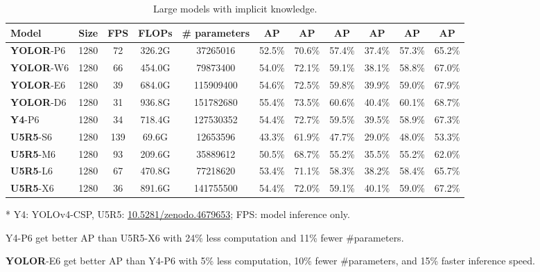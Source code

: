 \documentclass[10pt,twocolumn,letterpaper]{article}
\begin{document}
\begin{table*}[t]
	\centering
	\begin{threeparttable}[t]
		\footnotesize
		\caption{Large models with implicit knowledge.}
		\label{table:large}
		\setlength\tabcolsep{5.8pt}
		\begin{tabular}{lcccccccccc}
			\toprule
			\textbf{Model} & \textbf{Size} & \textbf{FPS} & \textbf{FLOPs} & \textbf{\# parameters} & \textbf{AP} & \textbf{AP} & \textbf{AP} & \textbf{AP} & \textbf{AP} & \textbf{AP} \\				
			\midrule
			\textbf{YOLOR}-P6 & 1280 & 72 & 326.2G & 37265016 & 52.5\% & 70.6\% & 57.4\% & 37.4\% & 57.3\% & 65.2\% \\
			\textbf{YOLOR}-W6 & 1280 & 66 & 454.0G & 79873400 & 54.0\% & 72.1\% & 59.1\% & 38.1\% & 58.8\% & 67.0\% \\
			\textbf{YOLOR}-E6 & 1280 & 39 & 684.0G & 115909400 & 54.6\% & 72.5\% & 59.8\% & 39.9\% & 59.0\% & 67.9\% \\
			\textbf{YOLOR}-D6 & 1280 & 31 & 936.8G & 151782680 & 55.4\% & 73.5\% & 60.6\% & 40.4\% & 60.1\% & 68.7\% \\
			\midrule
			\textbf{Y4}-P6 & 1280 & 34 & 718.4G & 127530352 & 54.4\% & 72.7\% & 59.5\% & 39.5\% & 58.9\% & 67.3\% \\
			\midrule
			\textbf{U5R5}-S6 & 1280 & 139 & 69.6G & 12653596 & 43.3\% & 61.9\% & 47.7\% & 29.0\% & 48.0\% & 53.3\% \\
			\textbf{U5R5}-M6 & 1280 & 93 & 209.6G & 35889612 & 50.5\% & 68.7\% & 55.2\% & 35.5\% & 55.2\% & 62.0\% \\
			\textbf{U5R5}-L6 & 1280 & 67 & 470.8G & 77218620 & 53.4\% & 71.1\% & 58.3\% & 38.2\% & 58.4\% & 65.7\% \\
			\textbf{U5R5}-X6 & 1280 & 36 & 891.6G & 141755500 & 54.4\% & 72.0\% & 59.1\% & 40.1\% & 59.0\% & 67.2\% \\
			\bottomrule
		\end{tabular}
		\begin{tablenotes}[flushleft]
			\footnotesize
			\item[*] Y4: YOLOv4-CSP, U5R5: \url{10.5281/zenodo.4679653}; FPS: model inference only.
			\item[] Y4-P6 get better AP than U5R5-X6 with 24\% less computation and 11\% fewer \#parameters.
			\item[] \textbf{YOLOR}-E6 get better AP than Y4-P6 with 5\% less computation, 10\% fewer \#parameters, and 15\% faster inference speed.
		\end{tablenotes}
	\end{threeparttable}
\end{table*}
\end{document}
